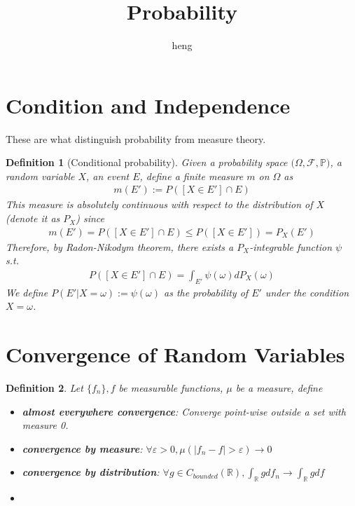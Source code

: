 \documentclass{article}
\newtheorem{definition}{Definition}
\begin{document}
\begin{CJK}{UTF8}{gbsn}

\title{Probability}
\author{heng}
\maketitle

\tableofcontents



\section{Condition and Independence}
These are what distinguish probability from measure theory.

\begin{definition}[Conditional probability]
	Given a probability space $(\Omega,\mathcal{F},\mathbb{P)}$, a random variable $X$, an event $E$, define a  finite measure $m$ on $\Omega$ as 
	\begin{align*}
		m(E'):=P([X\in E'] \cap E)
	\end{align*}
	This measure is absolutely continuous with respect to the distribution of $X$ (denote it as $P_X$) since
	\begin{align*}
		m(E')=P([X\in E'] \cap E)\leq P([X\in E'])=P_X(E')
	\end{align*}
	Therefore, by Radon-Nikodym theorem, there exists a $P_X$-integrable function $\psi$ s.t.
	\begin{align*}
		P([X\in E']\cap E)=\int_{E'}\psi(\omega)dP_X(\omega)
	\end{align*}
	We define $P(E'|X=\omega):=\psi(\omega)$ as the probability of $E'$ under the condition $X=\omega$.
\end{definition}
















\section{Convergence of Random Variables}
\begin{definition}
Let $\{f_n\},f$ be measurable functions, $\mu$ be a measure, define
	\begin{itemize}
  \item \textbf{almost everywhere convergence}: Converge point-wise outside a set with measure 0.
  \item \textbf{convergence by measure}: $\forall \varepsilon >0, \mu(|f_n-f|>\varepsilon)\rightarrow 0$
  \item \textbf{convergence by distribution}: $\forall g \in C_{bounded}(\mathbb{R}),\int_{\mathbb{R}}gdf_n\rightarrow \int_{\mathbb{R}}gdf$
  \item 
\end{itemize}


\end{definition}
\end{CJK}
\end{document}
